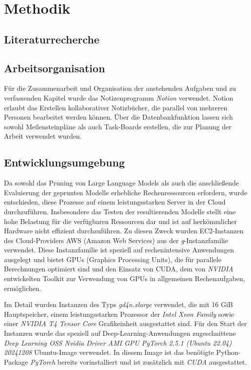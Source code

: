 \section{Methodik}\label{methodik}

\subsection{Literaturrecherche}

\subsection{Arbeitsorganisation}

Für die Zusammenarbeit und Organisation der anstehenden Aufgaben und zu
verfassenden Kapitel wurde das Notizenprogramm \emph{Notion} verwendet. Notion
erlaubt das Erstellen kollaborativer Notizbücher, die parallel von mehreren
Personen bearbeitet werden können. Über die Datenbankfunktion lassen sich sowohl
Meilensteinpläne als auch Task-Boards erstellen, die zur Planung der Arbeit
verwendet wurden.

\subsection{Entwicklungsumgebung}

Da sowohl das Pruning von Large Language Models als auch die anschließende
Evaluierung der geprunten Modelle erhebliche Rechenressourcen erfordern, wurde
entschieden, diese Prozesse auf einem leistungsstarken Server in der Cloud
durchzuführen. Insbesondere das Testen der resultierenden Modelle stellt eine
hohe Belastung für die verfügbaren Ressourcen dar und ist auf herkömmlicher
Hardware nicht effizient durchzuführen. Zu diesen Zweck wurden EC2-Instanzen des
Cloud-Providers AWS (Amazon Web Services) aus der \emph{g}-Instanzfamilie
verwendet. Diese Instanzfamilie ist speziell auf rechenintensive Anwendungen
ausgelegt und bietet GPUs (Graphics Processing Units), die für parallele
Berechnungen optimiert sind und den Einsatz von CUDA, dem von \emph{NVIDIA}
entwickelten Toolkit zur Verwendung von GPUs in allgemeinen Rechenaufgaben,
ermöglichen.

Im Detail wurden Instanzen des Typs \emph{gd4n.xlarge} verwendet, die mit 16 GiB
Hauptspeicher, einem leistungsstarken Prozessor der \emph{Intel Xeon Family}
sowie einer \emph{NVIDIA T4 Tensor Core} Grafikeinheit ausgestattet sind. Für
den Start der Instanzen wurde das speziell auf Deep-Learning-Anwendungen
zugeschnittene \emph{Deep Learning OSS Nvidia Driver AMI GPU PyTorch 2.5.1
	(Ubuntu 22.04) 20241208} Ubuntu-Image verwendet. In diesem Image ist das
benötigte Python-Package \emph{PyTorch} bereits vorinstalliert und ist
zusätzlich mit \emph{CUDA} ausgestattet.

